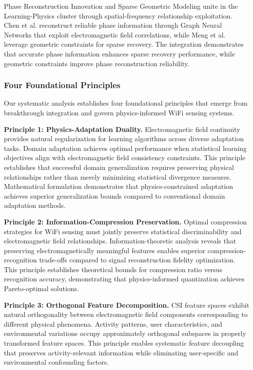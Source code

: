 \documentclass[journal]{IEEEtran}
\begin{document}
Phase Reconstruction Innovation and Sparse Geometric Modeling unite in the Learning-Physics cluster through spatial-frequency relationship exploitation. Chen et al. \cite{chen2024wiphase} reconstruct reliable phase information through Graph Neural Networks that exploit electromagnetic field correlations, while Meng et al. \cite{meng2021wihgr} leverage geometric constraints for sparse recovery. The integration demonstrates that accurate phase information enhances sparse recovery performance, while geometric constraints improve phase reconstruction reliability.

\subsubsection{Four Foundational Principles}

Our systematic analysis establishes four foundational principles that emerge from breakthrough integration and govern physics-informed WiFi sensing systems.

\textbf{Principle 1: Physics-Adaptation Duality.} Electromagnetic field continuity provides natural regularization for learning algorithms across diverse adaptation tasks. Domain adaptation achieves optimal performance when statistical learning objectives align with electromagnetic field consistency constraints. This principle establishes that successful domain generalization requires preserving physical relationships rather than merely minimizing statistical divergence measures. Mathematical formulation demonstrates that physics-constrained adaptation achieves superior generalization bounds compared to conventional domain adaptation methods.

\textbf{Principle 2: Information-Compression Preservation.} Optimal compression strategies for WiFi sensing must jointly preserve statistical discriminability and electromagnetic field relationships. Information-theoretic analysis reveals that preserving electromagnetically meaningful features enables superior compression-recognition trade-offs compared to signal reconstruction fidelity optimization. This principle establishes theoretical bounds for compression ratio versus recognition accuracy, demonstrating that physics-informed quantization achieves Pareto-optimal solutions.

\textbf{Principle 3: Orthogonal Feature Decomposition.} CSI feature spaces exhibit natural orthogonality between electromagnetic field components corresponding to different physical phenomena. Activity patterns, user characteristics, and environmental variations occupy approximately orthogonal subspaces in properly transformed feature spaces. This principle enables systematic feature decoupling that preserves activity-relevant information while eliminating user-specific and environmental confounding factors.
\end{document}
